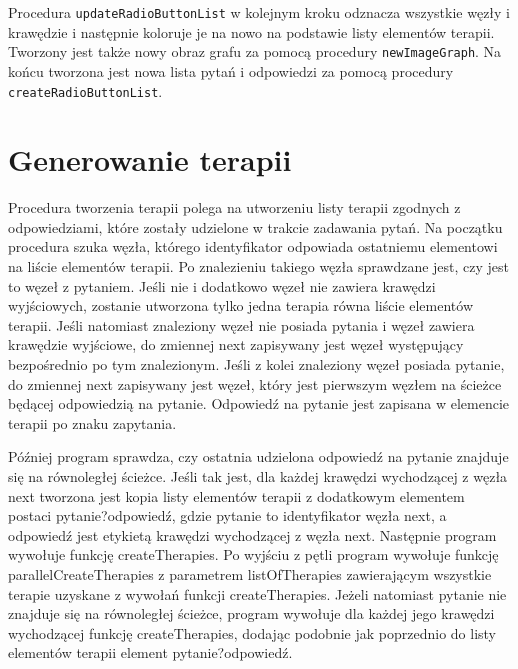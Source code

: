 Procedura \texttt{updateRadioButtonList} w kolejnym kroku odznacza wszystkie węzły i krawędzie i następnie koloruje je na nowo na podstawie listy elementów terapii. Tworzony jest także nowy obraz grafu za pomocą procedury \texttt{newImageGraph}. Na końcu tworzona jest nowa lista pytań i odpowiedzi za pomocą procedury \texttt{createRadioButtonList}. 


\section{Generowanie terapii}

Procedura tworzenia terapii polega na utworzeniu listy terapii zgodnych z odpowiedziami, które zostały udzielone w trakcie zadawania pytań. Na początku procedura szuka węzła, którego identyfikator odpowiada ostatniemu elementowi na liście elementów terapii. Po znalezieniu takiego węzła sprawdzane jest, czy jest to węzeł z pytaniem. Jeśli nie i dodatkowo węzeł nie zawiera krawędzi wyjściowych, zostanie utworzona tylko jedna terapia równa liście elementów terapii. Jeśli natomiast znaleziony węzeł nie posiada pytania i węzeł zawiera krawędzie wyjściowe, do zmiennej next zapisywany jest węzeł występujący bezpośrednio po tym znalezionym. Jeśli z kolei znaleziony węzeł posiada pytanie, do zmiennej next zapisywany jest węzeł, który jest pierwszym węzłem na ścieżce będącej odpowiedzią na pytanie. Odpowiedź na pytanie jest zapisana w elemencie terapii po znaku zapytania.

Później program sprawdza, czy ostatnia udzielona odpowiedź na pytanie znajduje się na równoległej ścieżce. Jeśli tak jest, dla każdej krawędzi wychodzącej z węzła next tworzona jest kopia listy elementów terapii z dodatkowym elementem postaci pytanie?odpowiedź, gdzie pytanie to identyfikator węzła next, a odpowiedź jest etykietą krawędzi wychodzącej z węzła next. 
Następnie program wywołuje funkcję createTherapies. Po wyjściu z pętli program wywołuje funkcję parallelCreateTherapies z parametrem listOfTherapies zawierającym wszystkie terapie uzyskane z wywołań funkcji createTherapies. Jeżeli natomiast pytanie nie znajduje się na równoległej ścieżce, program wywołuje dla każdej jego krawędzi wychodzącej funkcję createTherapies, dodając podobnie jak poprzednio do listy elementów terapii element pytanie?odpowiedź. 

